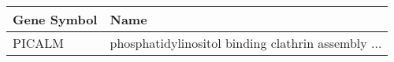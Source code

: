 \begin{tabular}{ll}
\toprule
Gene Symbol &                                               Name \\
\midrule
     PICALM & phosphatidylinositol binding clathrin assembly ... \\
\bottomrule
\end{tabular}
